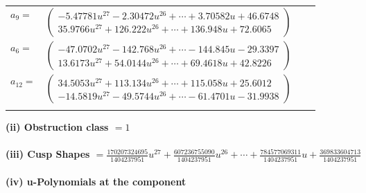 \documentclass[1p]{elsarticle_modified}
\theoremstyle{definition}
\begin{document}
\begin{tabular}{m{7pt} m{180pt} m{7pt} m{180pt} }
\flushright $a_{9}=$&$\begin{pmatrix}-5.47781 u^{27}-2.30472 u^{26}+\cdots+3.70582 u+46.6748\\35.9766 u^{27}+126.222 u^{26}+\cdots+136.948 u+72.6065\end{pmatrix}$ \\
\flushright $a_{6}=$&$\begin{pmatrix}-47.0702 u^{27}-142.768 u^{26}+\cdots-144.845 u-29.3397\\13.6173 u^{27}+54.0144 u^{26}+\cdots+69.4618 u+42.8226\end{pmatrix}$ \\
\flushright $a_{12}=$&$\begin{pmatrix}34.5053 u^{27}+113.134 u^{26}+\cdots+115.058 u+25.6012\\-14.5819 u^{27}-49.5744 u^{26}+\cdots-61.4701 u-31.9938\end{pmatrix}$\\&\end{tabular}
\flushleft \textbf{(ii) Obstruction class $= 1$}\\~\\
\flushleft \textbf{(iii) Cusp Shapes $= \frac{170207324695}{1404237951} u^{27}+\frac{607236755090}{1404237951} u^{26}+\cdots+\frac{784577069311}{1404237951} u+\frac{369833604713}{1404237951}$}\\~\\
\newpage\renewcommand{\arraystretch}{1}
\flushleft \textbf{(iv) u-Polynomials at the component}\newline \\
\end{document}
